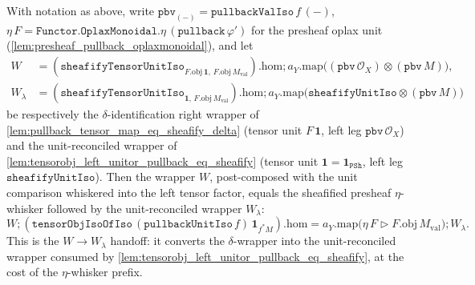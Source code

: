 \begin{lemma}


  \label{lem:pullback_unit_iso_whisker_eq_sheafify_eta_whisker}
  With notation as above, write \(\mathtt{pbv}_{(-)} = \mathtt{pullbackValIso}\,f\,(-)\),
  \(\eta\,F = \mathtt{Functor.OplaxMonoidal.}\eta\,(\mathtt{pullback}\,\varphi')\) for the presheaf
  oplax unit (\cref{lem:presheaf_pullback_oplaxmonoidal}), and let
  \begin{align*}
    W &= (\mathtt{sheafifyTensorUnitIso}_{F.\mathrm{obj}\,\mathbf 1,\,F.\mathrm{obj}\,M_{\mathrm{val}}}).\mathrm{hom}
      \mathbin{;} a_Y.\mathrm{map}\bigl((\mathtt{pbv}\,\mathcal{O}_X)\otimes(\mathtt{pbv}\,M)\bigr),\\
    W_{\lambda} &= (\mathtt{sheafifyTensorUnitIso}_{\mathbf 1,\,F.\mathrm{obj}\,M_{\mathrm{val}}}).\mathrm{hom}
      \mathbin{;} a_Y.\mathrm{map}\bigl(\mathtt{sheafifyUnitIso}\otimes(\mathtt{pbv}\,M)\bigr)
  \end{align*}
  be respectively the \(\delta\)-identification right wrapper of
  \cref{lem:pullback_tensor_map_eq_sheafify_delta} (tensor unit \(F\,\mathbf 1\), left leg
  \(\mathtt{pbv}\,\mathcal{O}_X\)) and the unit-reconciled wrapper of
  \cref{lem:tensorobj_left_unitor_pullback_eq_sheafify} (tensor unit \(\mathbf 1 =
  \mathbf 1_{\mathtt{PSh}}\), left leg \(\mathtt{sheafifyUnitIso}\)). Then the wrapper \(W\),
  post-composed with the unit comparison whiskered into the left tensor factor, equals the sheafified
  presheaf \(\eta\)-whisker followed by the unit-reconciled wrapper \(W_{\lambda}\):
  \[
    W \mathbin{;}
    (\mathtt{tensorObjIsoOfIso}\,(\mathtt{pullbackUnitIso}\,f)\,\mathbf 1_{f^{*}M}).\mathrm{hom}
    = a_Y.\mathrm{map}\bigl(\eta\,F \rhd F.\mathrm{obj}\,M_{\mathrm{val}}\bigr)
      \mathbin{;} W_{\lambda}.
  \]
  This is the \(W \to W_{\lambda}\) handoff: it converts the \(\delta\)-wrapper into the unit-reconciled
  wrapper consumed by \cref{lem:tensorobj_left_unitor_pullback_eq_sheafify}, at the cost of the
  \(\eta\)-whisker prefix.
\end{lemma}

